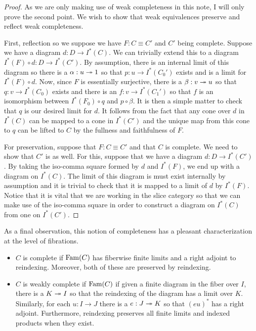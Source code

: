 \begin{proof}
  As we are only making use of weak completeness in this note, I will
  only prove the second point. We wish to show that weak equivalences
  preserve and reflect weak completeness.

  First, reflection so we suppose we have $F : C \equiv C'$ and $C'$
  being complete. Suppose we have a diagram $d : D \to I^*(C)$. We can
  trivially extend this to a diagram $I^*(F) \circ d : D \to I^*(C')$.
  By assumption, there is an internal limit of this diagram so there
  is a $\alpha : u \twoheadrightarrow 1$ so that $p : u \to I^*(C_0')$ exists and is
  a limit for $I^*(F) \circ d$. Now, since $F$ is essentially
  surjective, there is a $\beta : v \twoheadrightarrow u$ so that
  $q : v \to I^*(C_0)$ exists and there is an $f : v \to I^*(C_1')$ so
  that $f$ is an isomorphism between $I^*(F_0) \circ q$ and
  $p \circ \beta$. It is then a simple matter to check that $q$ is our
  desired limit for $d$. It follows from the fact that any cone over
  $d$ in $I^*(C)$ can be mapped to a cone in $I^*(C')$ and the unique
  map from this cone to $q$ can be lifted to $C$ by the fullness and
  faithfulness of $F$.

  For preservation, suppose that $F : C \equiv C'$ and that $C$ is
  complete. We need to show that $C'$ is as well. For this, suppose
  that we have a diagram $d : D \to I^*(C')$. By taking the iso-comma
  square formed by $d$ and $I^*(F)$, we end up with a diagram on
  $I^*(C)$. The limit of this diagram is must exist internally by
  assumption and it is trivial to check that it is mapped to a limit
  of $d$ by $I^*(F)$. Notice that it is vital that we are working in
  the slice category so that we can make use of the iso-comma square
  in order to construct a diagram on $I^*(C)$ from one on $I^*(C')$.
\end{proof}
As a final observation, this notion of completeness has a pleasant
characterization at the level of fibrations.
\begin{defn}\label{defn:complete:completefibration}
  \begin{itemize}
  \item $C$ is complete if $\operatorname{Fam}(C)$ has fiberwise finite limits and a
    right adjoint to reindexing. Moreover, both of these are preserved
    by reindexing.
  \item $C$ is weakly complete if $\operatorname{Fam}(C)$ if given a finite
    diagram in the fiber over $I$, there is a $K \twoheadrightarrow I$ so that the
    reindexing of the diagram has a limit over $K$. Similarly, for
    each $u : I \to J$ there is a $e : J \twoheadrightarrow K$ so that $(eu)^*$ has
    a right adjoint. Furthermore, reindexing preserves all finite
    limits and indexed products when they exist.
  \end{itemize}
\end{defn}
